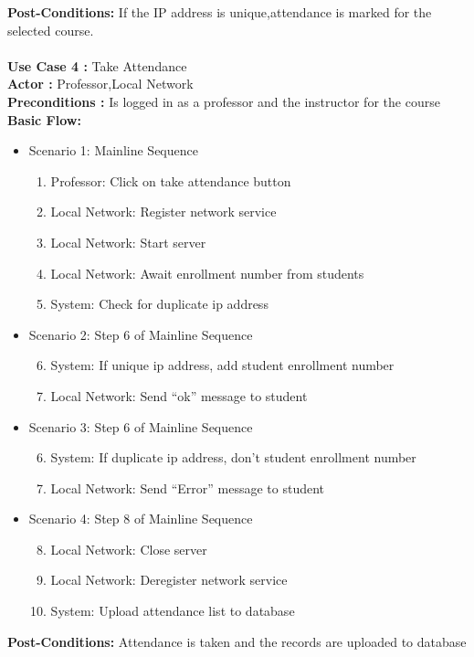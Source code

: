 \documentclass{article}
\begin{document}
\textbf{Post-Conditions:} If the IP address is unique,attendance is marked for the selected course.\\ \\
\textbf{Use Case 4 : }Take Attendance\\
\textbf{Actor : }Professor,Local Network\\
\textbf{Preconditions : }Is logged in as a professor and the instructor for the course\\
\textbf{Basic Flow: }
\begin{itemize}
\item Scenario 1: Mainline Sequence
	\begin{enumerate}
		\item Professor: Click on take attendance button
\item Local Network: Register network service
\item Local Network: Start server
\item Local Network: Await enrollment number from students
\item System: Check for duplicate ip address 
	\end{enumerate}
\item Scenario 2: Step 6 of Mainline Sequence
	\begin{enumerate}
		\setcounter{enumi}{5}
		\item System: If unique ip address, add student enrollment number
		\item Local Network: Send “ok” message to student
	\end{enumerate}
	\item Scenario 3: Step 6 of Mainline Sequence
	\begin{enumerate}
		\setcounter{enumi}{5}
		\item System: If duplicate ip address, don’t student enrollment number
		\item Local Network: Send “Error” message to student
	\end{enumerate}
	\item Scenario 4: Step 8 of Mainline Sequence
		\begin{enumerate}
			\setcounter{enumi}{7}
			\item Local Network: Close server
			\item Local Network: Deregister network service
			\item System: Upload attendance list to database
		\end{enumerate}
\end{itemize}
\textbf{Post-Conditions: }Attendance is taken and the records are uploaded to database\\ \\
\end{document}
